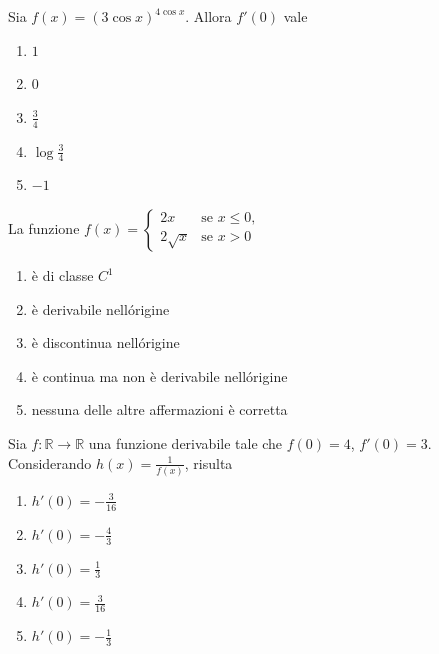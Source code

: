 \begin{quiz}
Sia $f(x)=(3\cos x)^{4\cos x}$. Allora $f\prime(0)$ vale
\begin{enumerate}
\item $1$
\item $0$
\item $\frac34$
\item $\log\frac34$
\item $-1$
\end{enumerate}
\end{quiz}

\begin{quiz}
La funzione $f(x)=\begin{cases}2x&\text{se }x\le0,\\2\sqrt x&\text{se }x>0\end{cases}$
\begin{enumerate}
\item \`e di classe $C^1$
\item \`e derivabile nell\'origine
\item \`e discontinua nell\'origine
\item \`e continua ma non \`e derivabile nell\'origine
\item nessuna delle altre affermazioni \`e corretta
\end{enumerate}
\end{quiz}

\begin{quiz}
Sia $f:\mathbb R\to\mathbb R$ una funzione derivabile tale che $f(0)=4$, $f\prime(0)=3$. Considerando $h(x)=\frac1{f(x)}$, risulta
\begin{enumerate}
\item $h\prime(0)=-\frac3{16}$
\item $h\prime(0)=-\frac43$
\item $h\prime(0)=\frac13$
\item $h\prime(0)=\frac3{16}$
\item $h\prime(0)=-\frac13$
\end{enumerate}
\end{quiz}

